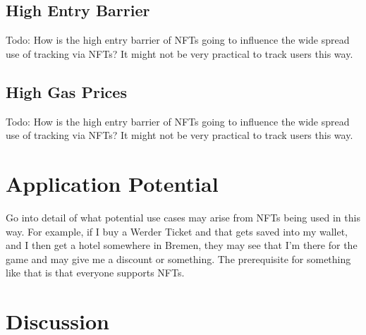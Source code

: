 %
%
\subsection{High Entry Barrier}
\label{sub:results:barrier}
Todo: How is the high entry barrier of NFTs going to influence the wide spread use of tracking via NFTs? It might not be very practical to track users this way.

%
%
\subsection{High Gas Prices}
\label{sub:results:barrier}
Todo: How is the high entry barrier of NFTs going to influence the wide spread use of tracking via NFTs? It might not be very practical to track users this way.


%
%
\section{Application Potential}
\label{sec:results:potential}
Go into detail of what potential use cases may arise from NFTs being used in this way. For example, if I buy a Werder Ticket and that gets saved into my wallet, and I then get a hotel somewhere in Bremen, they may see that I'm there for the game and may give me a discount or something. The prerequisite for something like that is that everyone supports NFTs.



%
%
\section{Discussion}
\label{sec:results:discussion}
